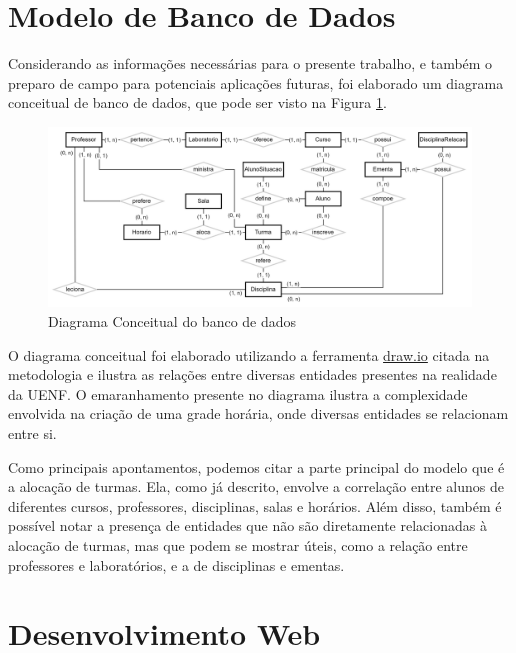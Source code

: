 \section{Modelo de Banco de Dados} %

Considerando as informações necessárias para o presente trabalho, e também o preparo de campo para potenciais aplicações futuras, foi elaborado um diagrama conceitual de banco de dados, que pode ser visto na Figura \ref{fig:DiagramConceitual}.

\begin{figure}[htbp]\centering
  \caption{\label{fig:DiagramConceitual} Diagrama Conceitual do banco de dados}
  \includegraphics[scale=0.2]{files/img/DiagramaConceitual/DiagramaConceitualBranco.png}
\end{figure} %

O diagrama conceitual foi elaborado utilizando a ferramenta \href{https://www.drawio.com/}{draw.io} citada na metodologia e ilustra as relações entre diversas entidades presentes na realidade da UENF. O emaranhamento presente no diagrama ilustra a complexidade envolvida na criação de uma grade horária, onde diversas entidades se relacionam entre si.

Como principais apontamentos, podemos citar a parte principal do modelo que é a alocação de turmas. Ela, como já descrito, envolve a correlação entre alunos de diferentes cursos, professores, disciplinas, salas e horários. Além disso, também é possível notar a presença de entidades que não são diretamente relacionadas à alocação de turmas, mas que podem se mostrar úteis, como a relação entre professores e laboratórios, e a de disciplinas e ementas.

\section{Desenvolvimento Web} %


